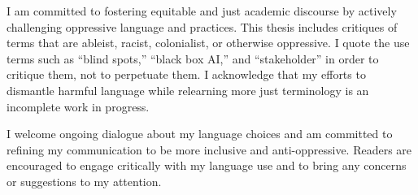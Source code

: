 
I am committed to fostering equitable and just academic discourse by actively challenging oppressive language and practices. This thesis includes critiques of terms that are ableist, racist, colonialist, or otherwise oppressive. I quote the use terms such as ``blind spots,” ``black box AI,” and ``stakeholder” in order to critique them, not to perpetuate them. I acknowledge that my efforts to dismantle harmful language while relearning more just terminology is an incomplete work in progress.

I welcome ongoing dialogue about my language choices and am committed to refining my communication to be more inclusive and anti-oppressive. Readers are encouraged to engage critically with my language use and to bring any concerns or suggestions to my attention.
